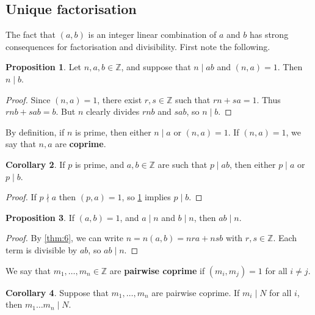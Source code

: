 \documentclass{article}
\newcommand{\Z}{\mathbb{Z}}
\newcommand{\rb}[1]{\left( #1 \right)}
\theoremstyle{definition}\newtheorem{definition}{Definition}
\theoremstyle{definition}\newtheorem*{remark}{Remark}
\theoremstyle{definition}\newtheorem*{example}{Example}
\theoremstyle{definition}\newtheorem*{note}{Note}
\newtheorem{proposition}[definition]{Proposition}
\newtheorem{corollary}[definition]{Corollary}
\begin{document}
\subsection{Unique factorisation}

The fact that $ \rb{a, b} $ is an integer linear combination of $ a $ and $ b $ has strong consequences for factorisation and divisibility. First note the following.

\begin{proposition}
\label{prop:7}
Let $ n, a, b \in \Z $, and suppose that $ n \mid ab $ and $ \rb{n, a} = 1 $. Then $ n \mid b $.
\end{proposition}

\begin{proof}
Since $ \rb{n, a} = 1 $, there exist $ r, s \in \Z $ such that $ rn + sa = 1 $. Thus $ rnb + sab = b $. But $ n $ clearly divides $ rnb $ and $ sab $, so $ n \mid b $.
\end{proof}

By definition, if $ n $ is prime, then either $ n \mid a $ or $ \rb{n, a} = 1 $. If $ \rb{n, a} = 1 $, we say that $ n, a $ are \textbf{coprime}.


\begin{corollary}
\label{cor:8}
If $ p $ is prime, and $ a, b \in \Z $ are such that $ p \mid ab $, then either $ p \mid a $ or $ p \mid b $.
\end{corollary}

\begin{proof}
If $ p \nmid a $ then $ \rb{p, a} = 1 $, so \ref{prop:7} implies $ p \mid b $.
\end{proof}

\begin{proposition}
\label{prop:9}
If $ \rb{a, b} = 1 $, and $ a \mid n $ and $ b \mid n $, then $ ab \mid n $.
\end{proposition}

\begin{proof}
By \ref{thm:6}, we can write $ n = n\rb{a, b} = nra + nsb $ with $ r, s \in \Z $. Each term is divisible by $ ab $, so $ ab \mid n $.
\end{proof}

We say that $ m_1, \dots, m_n \in \Z $ are \textbf{pairwise coprime} if $ \rb{m_i, m_j} = 1 $ for all $ i \ne j $.

\begin{corollary}
\label{cor:10}
Suppose that $ m_1, \dots, m_n $ are pairwise coprime. If $ m_i \mid N $ for all $ i $, then $ m_1 \dots m_n \mid N $.
\end{corollary}
\end{document}
